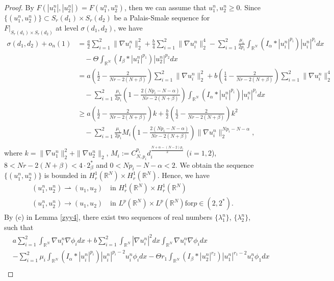 \documentclass[reqno]{amsart}
\begin{document}
\begin{proof}
By $F(|u_1^n|,|u_2^n|)=F(u_1^n,u_2^n)$, then we can assume that $u_1^n,u_2^n\geq0$. 
Since $\{(u_1^n,u_2^n)\}\subset S_r(d_1)\times S_r(d_2)$ be a
Palais-Smale sequence for $F|_{S_r(d_1)\times S_r(d_2)}$ at level $\sigma(d_1,d_2)$, 
we have
\begin{align*}
 \sigma(d_1,d_2)+o_n(1)
&= \frac{a}{2}\sum_{i=1}^2\| \nabla u_i^n\|_2^2+\frac{b}{4}\sum_{i=1}^2\| \nabla u_i^n\|_2^4-
 \sum_{i=1}^2\frac{\mu_i}{2p_i}\int_{\mathbb{R}^N}(I_\alpha\ast|u_i^n|^{p_i})|u_i^n|^{p_i}dx\\
&\quad -\Theta\int_{\mathbb{R}^N}(I_\beta\ast|u_1^n|^{p_1})|u_2^n|^{p_2}dx\\
&= a\left(\frac{1}{2}-\frac{2}{Nr-2(N+\beta)}\right)\sum_{i=1}^2\| \nabla u_i^n\|_2^2
 +b\left(\frac{1}{4}-\frac{2}{Nr-2(N+\beta)}\right)\sum_{i=1}^2\| \nabla u_i^n\|_2^4\\
&\quad -\sum_{i=1}^2\frac{\mu_i}{2p_i}\left(1-\frac{2(Np_i-N-\alpha)}{Nr-2(N+\beta)}\right)\int_{\mathbb{R}^N}(I_\alpha\ast|u_i^n|^{p_i})|u_i^n|^{p_i}dx\\
&\geq a\left(\frac{1}{2}-\frac{2}{Nr-2(N+\beta)}\right)k+\frac{b}{2}\left(\frac{1}{2}-\frac{2}{Nr-2(N+\beta)}\right)k^2\\
&\quad-\sum_{i=1}^2\frac{\mu_i}{2p_i}M_i\left(1-\frac{2(Np_i-N-\alpha)}{Nr-2(N+\beta)}\right)\|\nabla u_i^n\|_2^{Np_i-N-\alpha},\\
\end{align*}
where $k=\| \nabla u_1^n\|_2^2+\| \nabla u_2^n\|_2$,
$M_i:=C_{N,p_i}^{p_i}d_i^{\frac{N+\alpha-(N-2)p_i}{2}}$ ($i=1,2$),
$8<Nr-2(N+\beta)<4\cdot2_\beta^*$ and $0<Np_i-N-\alpha<2$. 
We obtain the sequence
$\{(u_1^n,u_2^n)\}$ is bounded in $H_r^1(\mathbb{R}^N)\times H_r^1(\mathbb{R}^N)$. 
Hence, we have
\begin{gather*}
(u_1^n,u_2^n)\rightharpoonup (u_1,u_2) \quad  \text{in } 
H_r^1(\mathbb{R}^N)  \times H_r^1(\mathbb{R}^N)\\
(u_1^n,u_2^n)\to  (u_1,u_2) \quad \text{in } 
L^p(\mathbb{R}^N)\times L^p(\mathbb{R}^N) \text{for} p\in(2,2^*).
\end{gather*}
By (c) in Lemma \ref{zyy4}, there exist two sequences of real numbers 
$\{\lambda_1^n\}$, $\{\lambda_2^n\}$, such that
\begin{align*}
&a\sum_{i=1}^2\int_{\mathbb{R}^N}\nabla u_i^n\nabla\phi_idx+b\sum_{i=1}^2\int_{\mathbb{R}^N}|\nabla u_i^n|^2dx\int_{\mathbb{R}^N}\nabla u_i^n\nabla\phi_idx\\
&-\sum_{i=1}^2\mu_i\int_{\mathbb{R}^N}(I_\alpha\ast|u_i^n|^{p_i})|u_i^n|^{p_i-2}u_i^n\phi_idx-\Theta r_1\int_{\mathbb{R}^N}(I_\beta\ast|u_2^n|^{r_2})|u_1^n|^{r_1-2}u_1^n\phi_1dx\\

\end{align*}
\end{proof}
\end{document}
